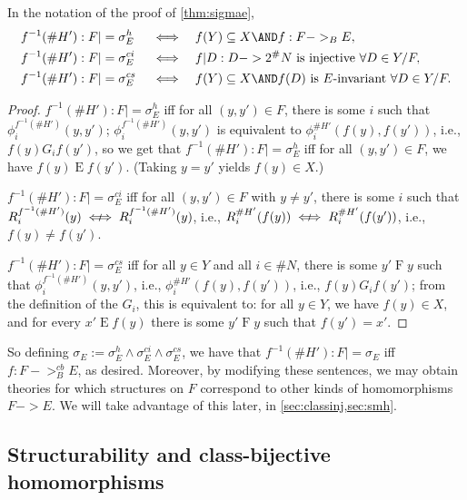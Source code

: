\documentclass[11pt]{article}
\begin{document}
\begin{lemma}
\label{lm:sigmae}
In the notation of the proof of \cref{thm:sigmae},
\begin{equation*}
\begin{aligned}
f^{-1}(\#H') : F &|= \sigma^h_E &&\iff && f(Y) \subseteq X \AND f : F ->_B E, \\
f^{-1}(\#H') : F &|= \sigma^{ci}_E &&\iff && f|D : D -> 2^\#N \text{ is injective } \forall D \in Y/F, \\
f^{-1}(\#H') : F &|= \sigma^{cs}_E &&\iff && f(Y) \subseteq X \AND f(D) \text{ is $E$-invariant } \forall D \in Y/F.
\end{aligned}
\end{equation*}
\end{lemma}
\begin{proof}
$f^{-1}(\#H') : F |= \sigma^h_E$ iff for all $(y, y') \in F$, there is some $i$ such that $\phi_i^{f^{-1}(\#H')}(y, y')$; $\phi_i^{f^{-1}(\#H')}(y, y')$ is equivalent to $\phi_i^{\#H'}(f(y), f(y'))$, i.e., $f(y) \mathrel{G_i} f(y')$, so we get that $f^{-1}(\#H') : F |= \sigma^h_E$ iff for all $(y, y') \in F$, we have $f(y) \mathrel{E} f(y')$.  (Taking $y = y'$ yields $f(y) \in X$.)

$f^{-1}(\#H') : F |= \sigma^{ci}_E$ iff for all $(y, y') \in F$ with $y \ne y'$, there is some $i$ such that $R_i^{f^{-1}(\#H')}(y) \mathrel{\mkern7mu\Longarrownot\mkern-7mu}\iff R_i^{f^{-1}(\#H')}(y)$, i.e., $R_i^{\#H'}(f(y)) \mathrel{\mkern7mu\Longarrownot\mkern-7mu}\iff R_i^{\#H'}(f(y'))$, i.e., $f(y) \ne f(y')$.

$f^{-1}(\#H') : F |= \sigma^{cs}_E$ iff for all $y \in Y$ and all $i \in \#N$, there is some $y' \mathrel{F} y$ such that $\phi_i^{f^{-1}(\#H')}(y, y')$, i.e., $\phi_i^{\#H'}(f(y), f(y'))$, i.e., $f(y) \mathrel{G_i} f(y')$; from the definition of the $G_i$, this is equivalent to: for all $y \in Y$, we have $f(y) \in X$, and for every $x' \mathrel{E} f(y)$ there is some $y' \mathrel{F} y$ such that $f(y') = x'$.
\end{proof}

So defining $\sigma_E := \sigma^h_E \wedge \sigma^{ci}_E \wedge \sigma^{cs}_E$, we have that $f^{-1}(\#H') : F |= \sigma_E$ iff $f : F ->_B^{cb} E$, as desired.  Moreover, by modifying these sentences, we may obtain theories for which structures on $F$ correspond to other kinds of homomorphisms $F -> E$.  We will take advantage of this later, in \cref{sec:classinj,sec:smh}.

\subsection{Structurability and class-bijective homomorphisms}
\label{sec:univstr}
\end{document}
